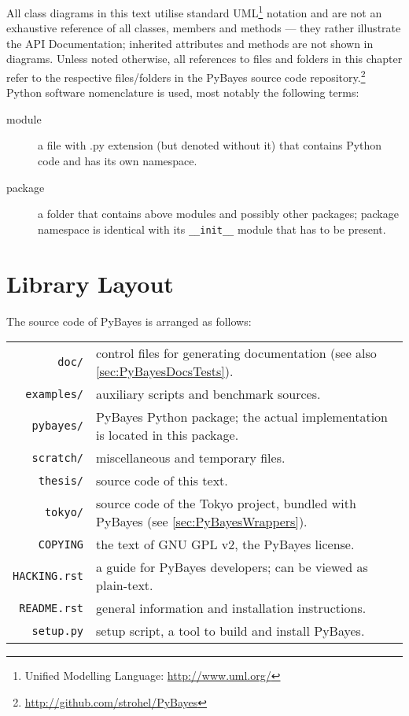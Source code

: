All class diagrams in this text utilise standard UML\footnote{Unified Modelling Language:
\url{http://www.uml.org/}} notation and are not an exhaustive reference of all classes, members and
methods --- they rather illustrate the API Documentation; inherited attributes and methods are not
shown in diagrams. Unless noted otherwise, all references to
files and folders in this chapter refer to the respective files/folders in the PyBayes source code
repository.\footnote{\url{http://github.com/strohel/PyBayes}} Python software nomenclature is used,
most notably the following terms:
\begin{description}
	\item[module] a file with .py extension (but denoted without it) that contains Python code and
		has its own namespace.
	\item[package] a folder that contains above modules and possibly other packages; package
		namespace is identical with its \verb|__init__| module that has to be present.
\end{description}

\section{Library Layout}

The source code of PyBayes is arranged as follows:

\noindent\begin{tabular}{rp{\textwidth-92pt}}
\verb|doc/|      & control files for generating documentation (see also \autoref{sec:PyBayesDocsTests}). \\
\verb|examples/| & auxiliary scripts and benchmark sources. \\
\verb|pybayes/|  & PyBayes Python package; the actual implementation is located in this package. \\
\verb|scratch/|  & miscellaneous and temporary files. \\
\verb|thesis/|   & source code of this text. \\
\verb|tokyo/|    & source code of the Tokyo project, bundled with PyBayes (see \autoref{sec:PyBayesWrappers}). \\
\verb|COPYING|   & the text of GNU GPL v2, the PyBayes license. \\
\verb|HACKING.rst| & a guide for PyBayes developers; can be viewed as plain-text. \\
\verb|README.rst|  & general information and installation instructions. \\
\verb|setup.py|    & setup script, a tool to build and install PyBayes. \\
\end{tabular}

